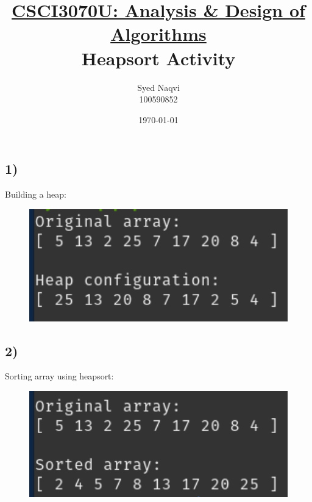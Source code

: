 \documentclass{article}
\title{\textbf{\underline{CSCI3070U: Analysis \& Design of Algorithms}\\Heapsort Activity}}
\author{Syed Naqvi\\100590852}
\date{\today}
\begin{document}
    \maketitle
    
    \subsection*{1)}
    
    \begin{center}
        \begin{minipage}[t]{0.9\textwidth}
            Building a heap:
            \begin{figure}[H]
                \centering
                \includegraphics[width=1\textwidth, height=0.2\textheight]{"./heapsort1).png"}
            \end{figure}
        \end{minipage}
    \end{center}

    \subsection*{2)}
    
    \begin{center}
        \begin{minipage}[t]{0.9\textwidth}
            Sorting array using heapsort:
            \begin{figure}[H]
                \centering
                \includegraphics[width=1\textwidth, height=0.2\textheight]{"./heapsort2).png"}
            \end{figure}
        \end{minipage}
    \end{center}
\end{document}
